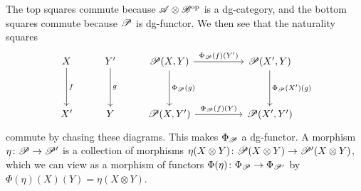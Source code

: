 \documentclass[dissertation.tex]{subfiles}
\begin{document}
\begin{rmk}
  The top squares commute because $\mathscr{A} \otimes \mathscr{B}^{\text{op}}$ is a dg-category, and the bottom squares commute because $\mathscr{P}$ is dg-functor.
  We then see that the naturality squares
  $$\begin{tikzcd}
    X \arrow{dd}{f} & Y^\prime \arrow{dd}{g} & \funct{P}(X,Y) \arrow{rr}{\Phi_{\funct{P}}(f)(Y^\prime)}\arrow{dd}{\Phi_{\funct{P}}(g)} && \funct{P}(X^\prime, Y)\arrow{dd}{\Phi_{\funct{P}}(X^\prime)(g)}\\
    \\
    X^\prime & Y & \funct{P}(X,Y^\prime) \arrow{rr}{\Phi_{\funct{P}}(f)(Y)} && \funct{P}(X^\prime,Y^\prime)
  \end{tikzcd}$$
  commute by chasing these diagrams.
  This makes $\Phi_{\mathscr{P}}$ a dg-functor.
  A morphism $\eta \colon \mathscr{P} \to \mathscr{P}^\prime$ is a collection of morphisms $\eta(X \otimes Y) \colon \mathscr{P}(X \otimes Y) \to \mathscr{P}^\prime(X \otimes Y)$, which we can view as a morphism of functors $\Phi(\eta) \colon \Phi_{\mathscr{P}} \to \Phi_{\mathscr{P}^\prime}$ by $\Phi(\eta)(X)(Y) = \eta(X \otimes Y)$.


\end{rmk}
\end{document}
